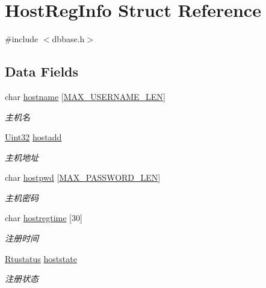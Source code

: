 \hypertarget{structHostRegInfo}{\section{Host\-Reg\-Info Struct Reference}
\label{structHostRegInfo}
}


{\ttfamily \#include $<$dbbase.\-h$>$}

\subsection*{Data Fields}
\begin{DoxyCompactItemize}
\item 
char \hyperlink{structHostRegInfo_abaad6f194144e79d59f3f50e7eb078af}{hostname} \mbox{[}\hyperlink{dbbase_8h_a6c4647395896246d6710ba980c31666c}{M\-A\-X\-\_\-\-U\-S\-E\-R\-N\-A\-M\-E\-\_\-\-L\-E\-N}\mbox{]}
\begin{DoxyCompactList}\small\item\em 主机名 \end{DoxyCompactList}\item 
\hyperlink{base_8h_a60cf7b3c038ce37a50796e8eaddf0b5f}{Uint32} \hyperlink{structHostRegInfo_a3b304abdc867e6ac1d510ccec832e844}{hostadd}
\begin{DoxyCompactList}\small\item\em 主机地址 \end{DoxyCompactList}\item 
char \hyperlink{structHostRegInfo_a19bb5479f6700b3eafb505d4cb16bf11}{hostpwd} \mbox{[}\hyperlink{dbbase_8h_ae9169c3fda2dfecbb7a13e394a69e5be}{M\-A\-X\-\_\-\-P\-A\-S\-S\-W\-O\-R\-D\-\_\-\-L\-E\-N}\mbox{]}
\begin{DoxyCompactList}\small\item\em 主机密码 \end{DoxyCompactList}\item 
char \hyperlink{structHostRegInfo_aae80f759cd5835a9b695f2707a1b60e4}{hostregtime} \mbox{[}30\mbox{]}
\begin{DoxyCompactList}\small\item\em 注册时间 \end{DoxyCompactList}\item 
\hyperlink{dbbase_8h_afec5109c9a49125c493619b015292bb0}{Rtustatus} \hyperlink{structHostRegInfo_a6f478e420e2736db1408a6dcd4927e8f}{hoststate}
\begin{DoxyCompactList}\small\item\em 注册状态 \end{DoxyCompactList}\item 

\end{DoxyCompactItemize}
